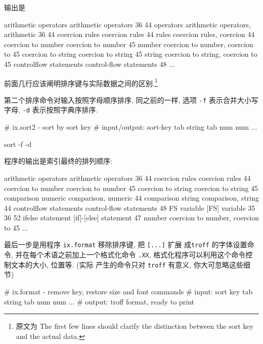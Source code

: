 {
输出是
\begin{file}
    arithmetic operators        arithmetic operators    36 44
    operators arithmetic        operators, arithmetic   36 44
    coercion rules      coercion rules  44
    rules coercion      rules, coercion 44
    coercion to number  coercion to number      45
    number coercion to  number, coercion to     45
    coercion to string  coercion to string      45
    string coercion to  string, coercion to     45
    controlflow statements      control-flow statements 48
    ...
\end{file}
前面几行应该阐明排序键与实际数据之间的区别.\footnote{原文为 The first few
    lines should clarify the distinction between the sort key and the
actual data.}

第二个排序命令对输入按照字母顺序排序, 同之前的一样, 选项 \texttt{-f}
表示合并大小写字母, \texttt{-d} 表示按照字典序排序.
\begin{awkcode}
    # ix.sort2 - sort by sort key
    #     input/output: sort-key tab string tab num num ...

    sort -f -d
\end{awkcode}
程序的输出是索引最终的排列顺序:
\begin{file}
    arithmetic operators        arithmetic operators    36 44
    coercion rules      coercion rules  44
    coercion to number  coercion to number      45
    coercion to string  coercion to string      45
    comparison numeric  comparison, numeric     44
    comparison string   comparison, string      44
    controlflow statements      control-flow statements 48
    FS variable [FS] variable   35 36 52
    ifelse statement    [if]-[else] statement   47
    number coercion to  number, coercion to     45
    ...
\end{file}

最后一步是用程序 \texttt{ix.format} 移除排序键, 把 \texttt{[...]} 扩展
成\texttt{troff} 的字体设置命令, 并在每个术语之前加上一个格式化命令
\texttt{.XX}, 格式化程序可以利用这个命令控制文本的大小, 位置等. (实际 
产生的命令只对 \texttt{troff} 有意义, 你大可忽略这些细节)
\begin{awkcode}
    # ix.format - remove key, restore size and font commands
    #   input:  sort key tab string tab num num ...
    #   output: troff format, ready to print


\end{awkcode}}
